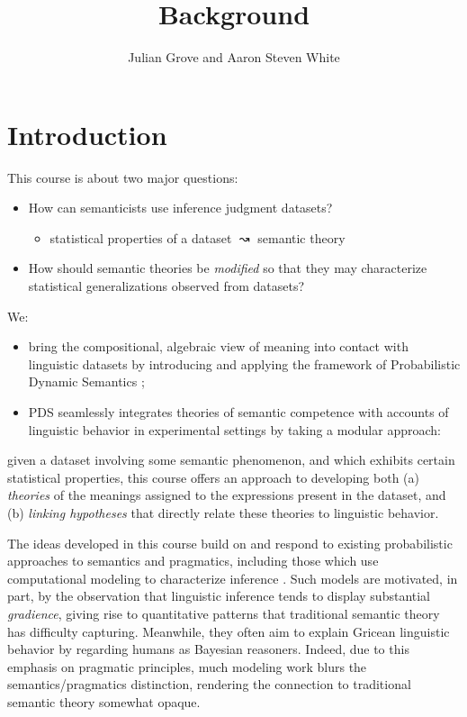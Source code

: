 \documentclass[nobib,nohyper]{tufte-handout}
\title{Background}
\author{Julian Grove and Aaron Steven White}
\date{}
\begin{document}
\maketitle

\section{Introduction}

This course is about two major questions:
\begin{itemize}
\item How can semanticists use inference judgment datasets?
  \begin{itemize}
  \item statistical properties of a dataset \(↝\) semantic theory
  \end{itemize}
\item How should semantic theories be \emph{modified} so that they may characterize statistical generalizations observed from datasets?
\end{itemize}

\noindent We:
\begin{itemize}
\item bring the compositional, algebraic view of meaning into contact with linguistic datasets by introducing and applying the framework of Probabilistic Dynamic Semantics \parencite[PDS;][]{grove_factivity_2024,grove_modeling_2025,grove_probabilistic_2024};
\item PDS seamlessly integrates theories of semantic competence with accounts of linguistic behavior in experimental settings by taking a modular approach:
\end{itemize}

given a dataset involving some semantic phenomenon, and which exhibits certain statistical properties, this course offers an approach to developing both (a) \emph{theories} of the meanings assigned to the expressions present in the dataset, and (b) \emph{linking hypotheses} that directly relate these theories to linguistic behavior.

The ideas developed in this course build on and respond to existing probabilistic approaches to semantics and pragmatics, including those which use computational modeling to characterize inference \parencite{van_eijck_probabilistic_2012,zeevat_bayesian_2015,franke_probabilistic_2016,brasoveanu_computational_2020,bernardy_bayesian_2022,goodman_probabilistic_nodate}.
Such models are motivated, in part, by the observation that linguistic inference tends to display substantial \emph{gradience}, giving rise to quantitative patterns that traditional semantic theory has difficulty capturing.
Meanwhile, they often aim to explain Gricean linguistic behavior \parencite{grice_logic_1975} by regarding humans as Bayesian reasoners.
Indeed, due to this emphasis on pragmatic principles, much modeling work blurs the semantics/pragmatics distinction, rendering the connection to traditional semantic theory somewhat opaque.
\end{document}
